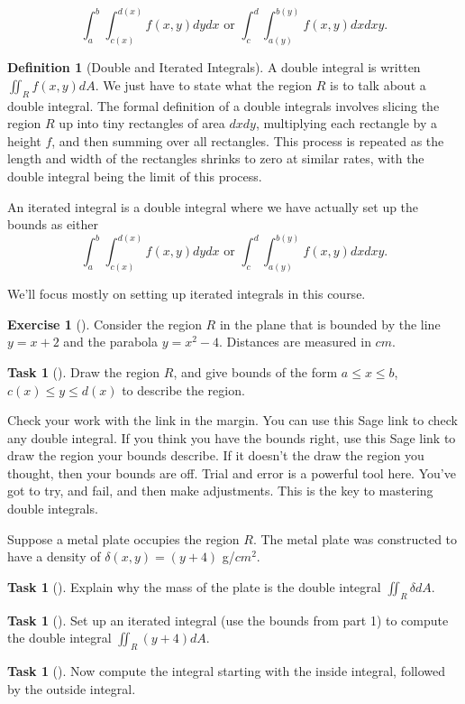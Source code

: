 \documentclass[10pt,]{book}
\theoremstyle{plain}
\theoremstyle{definition}
\newtheorem{definition}[theorem]{Definition}
\theoremstyle{definition}
\theoremstyle{definition}
\theoremstyle{definition}
\newtheorem{exploration}[project]{Exercise}
\newtheorem{task}[project]{Task}
\theoremstyle{definition}
\numberwithin{equation}{section}
\newcommand{\ds}{\displaystyle}
\begin{document}
\begin{equation*}
\ds \int_a^b \int_{c(x)}^{d(x)}f(x,y)dydx  \text{ or }  
\ds \int_c^d \int_{a(y)}^{b(y)}f(x,y)dxdxy.
\end{equation*}
%
\begin{definition}[{Double and Iterated Integrals}]\label{definition-40}
A double integral is written \(\ds \iint_R f(x,y)dA\). We just have to state what the region \(R\) is to talk about a double integral. The formal definition of a double integrals involves slicing the region \(R\) up into tiny rectangles of area \(dxdy\), multiplying each rectangle by a height \(f\), and then summing over all rectangles. This process is repeated as the length and width of the rectangles shrinks to zero at similar rates, with the double integral being the limit of this process.%
\par
An iterated integral is a double integral where we have actually set up the bounds as either%
\begin{equation*}
\ds \int_a^b \int_{c(x)}^{d(x)}f(x,y)dydx  \text{ or }  
\ds \int_c^d \int_{a(y)}^{b(y)}f(x,y)dxdxy.
\end{equation*}
%
\par
We'll focus mostly on setting up iterated integrals in this course.%
\end{definition}
\begin{exploration}[]\label{exploration-251}
Consider the region \(R\) in the plane that is bounded by the line \(y=x+2\) and the parabola \(y=x^2-4\). Distances are measured in \(cm\).%
\begin{task}[]\label{task-681}
Draw the region \(R\), and give bounds of the form \(a\leq x\leq b\), \(c(x)\leq y\leq d(x)\) to describe the region.%
\end{task}
Check your work with the link in the margin. You can use this Sage link to check any double integral. If you think you have the bounds right, use this Sage link to draw the region your bounds describe. If it doesn't the draw the region you thought, then your bounds are off. Trial and error is a powerful tool here. You've got to try, and fail, and then make adjustments. This is the key to mastering double integrals.%
\par
Suppose a metal plate occupies the region \(R\). The metal plate was constructed to have a density of \(\delta (x,y)=(y+4)\) g/\(cm^2\).%
\begin{task}[]\label{task-682}
Explain why the mass of the plate is the double integral \(\ds\iint_R \delta dA\).%
\end{task}
\begin{task}[]\label{task-683}
Set up an iterated integral (use the bounds from part 1) to compute the double integral \(\ds\iint_R (y+4) dA\).%
\end{task}
\begin{task}[]\label{task-684}
Now compute the integral starting with the inside integral, followed by the outside integral.%
\end{task}
\end{exploration}
\end{document}
